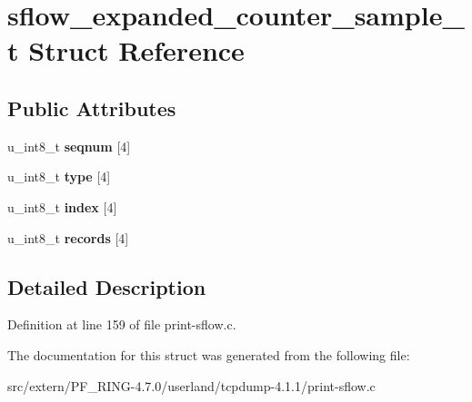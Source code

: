 \hypertarget{structsflow__expanded__counter__sample__t}{
\section{sflow\_\-expanded\_\-counter\_\-sample\_\-t Struct Reference}
\label{structsflow__expanded__counter__sample__t}
}
\subsection*{Public Attributes}
\begin{DoxyCompactItemize}
\item 
\hypertarget{structsflow__expanded__counter__sample__t_a1bdef2499f7096e4d2944774d96a09d7}{
u\_\-int8\_\-t {\bfseries seqnum} \mbox{[}4\mbox{]}}
\label{structsflow__expanded__counter__sample__t_a1bdef2499f7096e4d2944774d96a09d7}

\item 
\hypertarget{structsflow__expanded__counter__sample__t_a20ae20b46c4ff112665f37a3f2c905e4}{
u\_\-int8\_\-t {\bfseries type} \mbox{[}4\mbox{]}}
\label{structsflow__expanded__counter__sample__t_a20ae20b46c4ff112665f37a3f2c905e4}

\item 
\hypertarget{structsflow__expanded__counter__sample__t_aa7f2d731c3b335a93ee10927462d2ca2}{
u\_\-int8\_\-t {\bfseries index} \mbox{[}4\mbox{]}}
\label{structsflow__expanded__counter__sample__t_aa7f2d731c3b335a93ee10927462d2ca2}

\item 
\hypertarget{structsflow__expanded__counter__sample__t_ab95f6746c31f1f78ab9e8a9b0176bb49}{
u\_\-int8\_\-t {\bfseries records} \mbox{[}4\mbox{]}}
\label{structsflow__expanded__counter__sample__t_ab95f6746c31f1f78ab9e8a9b0176bb49}

\end{DoxyCompactItemize}


\subsection{Detailed Description}


Definition at line 159 of file print-\/sflow.c.



The documentation for this struct was generated from the following file:\begin{DoxyCompactItemize}
\item 
src/extern/PF\_\-RING-\/4.7.0/userland/tcpdump-\/4.1.1/print-\/sflow.c\end{DoxyCompactItemize}
